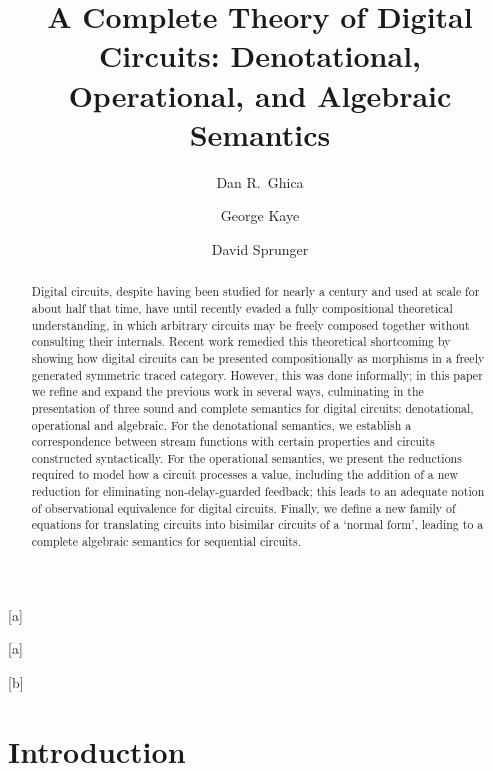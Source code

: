 \documentclass{lmcs}
\begin{document}
\title[A Complete Theory of Digital Circuits]{%
    A Complete Theory of Digital Circuits: %
    Denotational, Operational, and Algebraic Semantics}%

\author[D.~R.~Ghica]{Dan R.\ Ghica}[a]
\author[G.~Kaye]{George Kaye}[a]
\author[D.~Sprunger]{David Sprunger}[b]


\address{University of Birmingham}

\address{Indiana State University}

\begin{abstract}
    Digital circuits, despite having been studied for nearly a century and used
    at scale for about half that time, have until recently evaded a fully
    compositional theoretical understanding, in which arbitrary circuits may be
    freely composed together without consulting their internals.
    Recent work remedied this theoretical shortcoming by showing how digital
    circuits can be presented compositionally as morphisms in a freely generated
    symmetric traced category.
    However, this was done informally; in this paper we refine and expand the
    previous work in several ways, culminating in the presentation of three
    sound and complete semantics for digital circuits: denotational, operational
    and algebraic.
    For the denotational semantics, we establish a correspondence between
    stream functions with certain properties and circuits constructed
    syntactically.
    For the operational semantics, we present the reductions required to model
    how a circuit processes a value, including the addition of a new reduction
    for eliminating non-delay-guarded feedback; this leads to an adequate notion
    of observational equivalence for digital circuits.
    Finally, we define a new family of equations for translating circuits into
    bisimilar circuits of a `normal form', leading to a complete algebraic
    semantics for sequential circuits.
\end{abstract}

\maketitle

\section{Introduction}
\end{document}
